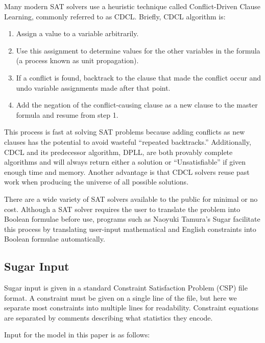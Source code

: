 \documentclass[runningheads]{llncs}
\begin{document}
Many modern SAT solvers use a heuristic technique called Conflict-Driven
Clause Learning, commonly referred to as CDCL\cite{cdcl}. Briefly, CDCL algorithm
is:

\begin{enumerate}

\item Assign a value to a variable arbitrarily.
\item Use this assignment to determine values for the other variables
  in the formula (a process known as unit propagation).
\item If a conflict is found, backtrack to the clause that made the
  conflict occur and undo variable assignments made after that point.
\item Add the negation of the conflict-causing clause as a new clause
  to the master formula and resume from step 1.

\end{enumerate}

This process is fast at solving SAT problems because adding conflicts as new clauses
has the potential to avoid wasteful ``repeated backtracks.''
Additionally, CDCL and its predecessor algorithm, DPLL, are both
provably complete algorithms and will always return either a solution
or ``Unsatisfiable'' if given enough time and memory. Another
advantage is that CDCL solvers reuse past work when producing the universe of all
possible solutions.

There are a wide variety of SAT solvers available to the public for
minimal or no cost. Although a SAT solver requires the user to
translate the problem into Boolean formulae before use, programs such
as Naoyuki Tamura's Sugar facilitate this process by translating
user-input mathematical and English constraints into Boolean formulae
automatically.

\subsection{Sugar Input}

Sugar input is given in a standard Constraint Satisfaction Problem
(CSP) file format. A constraint must be given on a single line of the
file, but here we separate most constraints into multiple lines for
readability. Constraint equations are separated by comments describing
what statistics they encode.

Input for the model in this paper is as follows:

\end{document}
